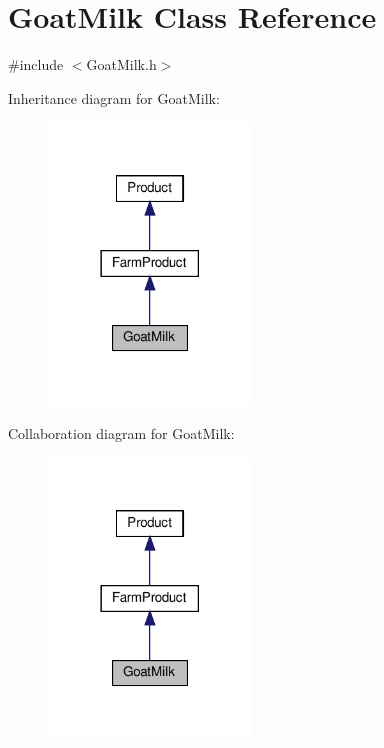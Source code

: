 \hypertarget{classGoatMilk}{}\section{Goat\+Milk Class Reference}
\label{classGoatMilk}


{\ttfamily \#include $<$Goat\+Milk.\+h$>$}



Inheritance diagram for Goat\+Milk\+:
\nopagebreak
\begin{figure}[H]
\begin{center}
\leavevmode
\includegraphics[width=153pt]{classGoatMilk__inherit__graph}
\end{center}
\end{figure}


Collaboration diagram for Goat\+Milk\+:
\nopagebreak
\begin{figure}[H]
\begin{center}
\leavevmode
\includegraphics[width=153pt]{classGoatMilk__coll__graph}
\end{center}
\end{figure}
